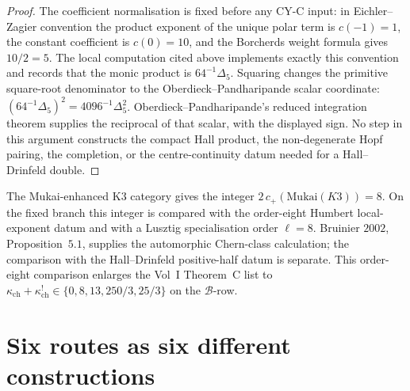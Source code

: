 \begin{proof}
The coefficient normalisation is fixed before any CY-C input: in
Eichler--Zagier convention the product exponent of the unique polar term
is \(c(-1)=1\), the constant coefficient is \(c(0)=10\), and the
Borcherds weight formula gives \(10/2=5\). The local computation cited
above implements exactly this convention and records that the monic
product is \(64^{-1}\Delta_5\). Squaring changes the primitive
square-root denominator to the Oberdieck--Pandharipande scalar coordinate:
\((64^{-1}\Delta_5)^2=4096^{-1}\Delta_5^2\). Oberdieck--Pandharipande's
reduced integration theorem supplies the reciprocal of that scalar,
with the displayed sign. No step in this argument constructs the
compact Hall product, the non-degenerate Hopf pairing, the completion,
or the centre-continuity datum needed for a Hall--Drinfeld double.
\end{proof}

\begin{remark}
\label{rem:cy-c-six-routes-mukai-doubling}
The Mukai-enhanced K3 category gives the integer
\(2\,c_+(\mathrm{Mukai}(K3))=8\). On the fixed branch this integer is
compared with the order-eight Humbert local-exponent datum and with a
Lusztig specialisation order \(\ell=8\). Bruinier \(2002\),
Proposition~\(5.1\), supplies the automorphic Chern-class calculation;
the comparison with the Hall--Drinfeld positive-half datum is separate.
This order-eight comparison enlarges the Vol~I Theorem~C list to
\(\kappa_{\mathrm{ch}}+\kappa_{\mathrm{ch}}^!\in\{0,8,13,250/3,25/3\}\)
on the \(\mathcal B\)-row.
\end{remark}

\section{Six routes as six different constructions}
\label{sec:cy-c-six-routes-phi-discipline}

